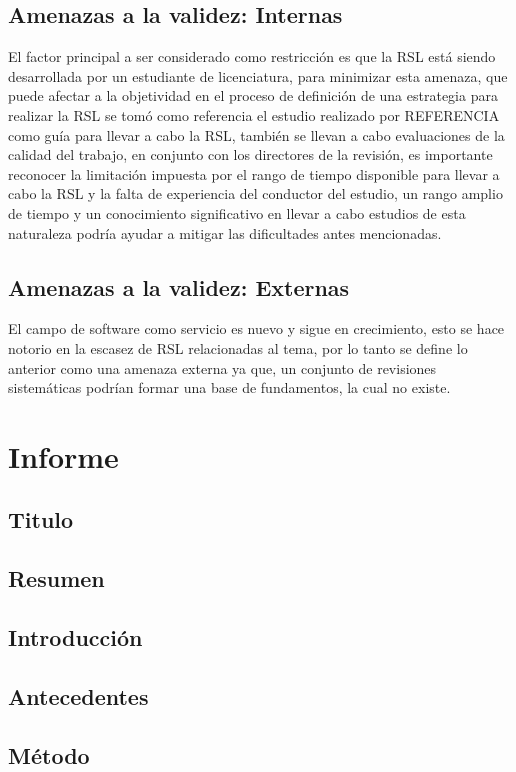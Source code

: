 \documentclass{article}
\begin{document}
\subsection{Amenazas a la validez: Internas}
El factor principal a ser considerado como restricción es que la RSL está siendo 
desarrollada por un estudiante de licenciatura, para minimizar esta amenaza, que puede afectar a la objetividad 
en el proceso de definición de una estrategia para realizar la RSL se tomó como referencia el estudio realizado por REFERENCIA 
como guía para llevar a cabo la RSL, también se llevan a cabo evaluaciones de la calidad del trabajo, en conjunto 
con los directores de la revisión, es importante reconocer la limitación impuesta por el rango de tiempo disponible para 
llevar a cabo la RSL y la falta de experiencia del conductor del estudio, un rango amplio de tiempo y un conocimiento significativo 
en llevar a cabo estudios de esta naturaleza podría ayudar a mitigar las dificultades antes mencionadas.

\subsection{Amenazas a la validez: Externas}
El campo de software como servicio es nuevo y sigue en crecimiento, esto se hace notorio en la escasez de 
RSL relacionadas al tema, por lo tanto se define lo anterior como  una amenaza externa ya que, un conjunto 
de revisiones sistemáticas podrían formar una base de fundamentos, la cual no existe.
\newpage


\section{Informe}
\subsection{Titulo}
\subsection{Resumen}
\subsection{Introducción}
\subsection{Antecedentes}
\subsection{Método}
\end{document}
